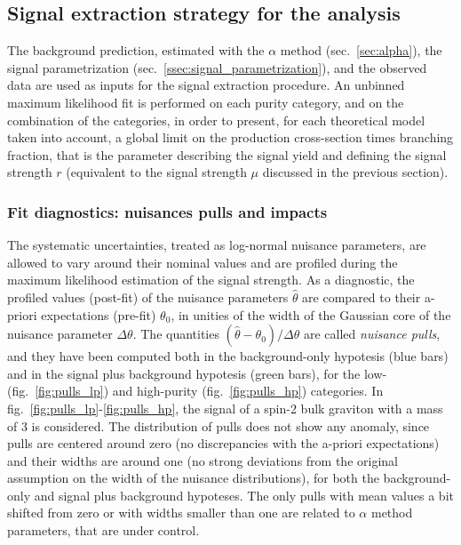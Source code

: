
\subsection{Signal extraction strategy for the analysis}

The background prediction, estimated with the $\alpha$ method (sec.~\ref{sec:alpha}), the signal parametrization (sec.~\ref{ssec:signal_parametrization}), and the observed data are used as inputs for the signal extraction procedure. An unbinned maximum likelihood fit is performed on each purity category, and on the combination of the categories, in order to present, for each theoretical model taken into account, a global limit on the production cross-section times branching fraction, that is the parameter describing the signal yield and defining the signal strength $r$ (equivalent to the signal strength $\mu$ discussed in the previous section).

\subsubsection{Fit diagnostics: nuisances pulls and impacts}

The systematic uncertainties, treated as log-normal nuisance parameters, are allowed to vary around their nominal values and are profiled during the maximum likelihood estimation of the signal strength. As a diagnostic, the profiled values (post-fit) of the nuisance parameters $\hat{\theta}$ are compared to their a-priori expectations (pre-fit) $\theta_0$, in unities of the width of the Gaussian core of the nuisance parameter $\Delta \theta$. The quantities $(\hat{\theta} - \theta_0) / \Delta \theta$ are called \emph{nuisance pulls}, and they have been computed both in the background-only hypotesis (blue bars) and in the signal plus background hypotesis (green bars), for the low- (fig.~\ref{fig:pulls_lp}) and high-purity (fig.~\ref{fig:pulls_hp}) categories. In fig.~\ref{fig:pulls_lp}-\ref{fig:pulls_hp}, the signal of a spin-2 bulk graviton with a mass of 3 \TeV is considered. The distribution of pulls does not show any anomaly, since pulls are centered around zero (no discrepancies with the a-priori expectations) and their widths are around one (no strong deviations from the original assumption on the width of the nuisance distributions), for both the background-only and signal plus background hypoteses. The only pulls with mean values a bit shifted from zero or with widths smaller than one are related to $\alpha$ method parameters, that are under control.

